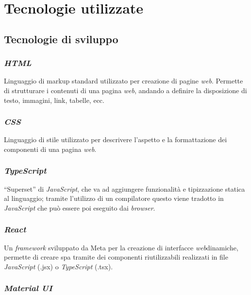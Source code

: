 \pagebreak
\section{Tecnologie utilizzate}
\label{sez:tecnologie-utilizzate}

\subsection{Tecnologie di sviluppo}
\label{sez:tecnologie-sviluppo}


\subsubsection{\textit{HTML}}

Linguaggio di markup standard utilizzato per creazione di pagine \textit{web}.
Permette di strutturare i contenuti di una pagina \textit{web}, andando a definire la disposizione di testo, immagini, link, tabelle, ecc.

\subsubsection{\textit{CSS}}
Linguaggio di stile utilizzato per descrivere l’aspetto e la formattazione dei componenti di una pagina \textit{web}.

\subsubsection{\textit{TypeScript}}

“Superset” di \textit{JavaScript}, che va ad aggiungere funzionalità e tipizzazione statica al linguaggio; 
tramite l’utilizzo di un compilatore questo viene tradotto in \textit{JavaScript} che può essere poi eseguito dai \textit{browser}.

\subsubsection{\textit{React}}
Un \textit{framework} sviluppato da Meta per la creazione di interfacce \textit{web}dinamiche, permette di creare \gls{spa} tramite dei componenti riutilizzabili realizzati in file \textit{JavaScript} (.jsx) o \textit{TypeScript} (.tsx).

\subsubsection{\textit{Material UI}}

